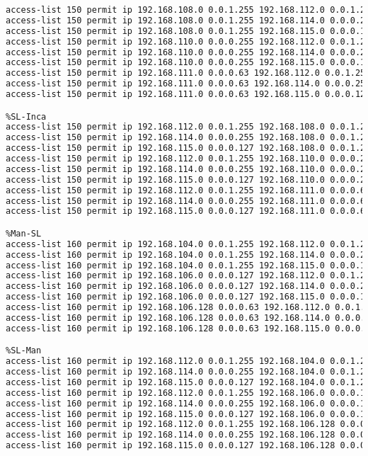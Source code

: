 \begin{lstlisting}[language=Bash, caption={Configuración ACLs Routers Interconexión}]
%Inca-SL
access-list 150 permit ip 192.168.108.0 0.0.1.255 192.168.112.0 0.0.1.255 
access-list 150 permit ip 192.168.108.0 0.0.1.255 192.168.114.0 0.0.0.255 
access-list 150 permit ip 192.168.108.0 0.0.1.255 192.168.115.0 0.0.0.127 
access-list 150 permit ip 192.168.110.0 0.0.0.255 192.168.112.0 0.0.1.255 
access-list 150 permit ip 192.168.110.0 0.0.0.255 192.168.114.0 0.0.0.255 
access-list 150 permit ip 192.168.110.0 0.0.0.255 192.168.115.0 0.0.0.127 
access-list 150 permit ip 192.168.111.0 0.0.0.63 192.168.112.0 0.0.1.255 
access-list 150 permit ip 192.168.111.0 0.0.0.63 192.168.114.0 0.0.0.255 
access-list 150 permit ip 192.168.111.0 0.0.0.63 192.168.115.0 0.0.0.127

%SL-Inca
access-list 150 permit ip 192.168.112.0 0.0.1.255 192.168.108.0 0.0.1.255  
access-list 150 permit ip 192.168.114.0 0.0.0.255 192.168.108.0 0.0.1.255  
access-list 150 permit ip 192.168.115.0 0.0.0.127 192.168.108.0 0.0.1.255  
access-list 150 permit ip 192.168.112.0 0.0.1.255 192.168.110.0 0.0.0.255  
access-list 150 permit ip 192.168.114.0 0.0.0.255 192.168.110.0 0.0.0.255  
access-list 150 permit ip 192.168.115.0 0.0.0.127 192.168.110.0 0.0.0.255  
access-list 150 permit ip 192.168.112.0 0.0.1.255 192.168.111.0 0.0.0.63  
access-list 150 permit ip 192.168.114.0 0.0.0.255 192.168.111.0 0.0.0.63  
access-list 150 permit ip 192.168.115.0 0.0.0.127 192.168.111.0 0.0.0.63 

%Man-SL
access-list 160 permit ip 192.168.104.0 0.0.1.255 192.168.112.0 0.0.1.255
access-list 160 permit ip 192.168.104.0 0.0.1.255 192.168.114.0 0.0.0.255
access-list 160 permit ip 192.168.104.0 0.0.1.255 192.168.115.0 0.0.0.127
access-list 160 permit ip 192.168.106.0 0.0.0.127 192.168.112.0 0.0.1.255
access-list 160 permit ip 192.168.106.0 0.0.0.127 192.168.114.0 0.0.0.255
access-list 160 permit ip 192.168.106.0 0.0.0.127 192.168.115.0 0.0.0.127
access-list 160 permit ip 192.168.106.128 0.0.0.63 192.168.112.0 0.0.1.255
access-list 160 permit ip 192.168.106.128 0.0.0.63 192.168.114.0 0.0.0.255
access-list 160 permit ip 192.168.106.128 0.0.0.63 192.168.115.0 0.0.0.127

%SL-Man
access-list 160 permit ip 192.168.112.0 0.0.1.255 192.168.104.0 0.0.1.255 
access-list 160 permit ip 192.168.114.0 0.0.0.255 192.168.104.0 0.0.1.255 
access-list 160 permit ip 192.168.115.0 0.0.0.127 192.168.104.0 0.0.1.255 
access-list 160 permit ip 192.168.112.0 0.0.1.255 192.168.106.0 0.0.0.127 
access-list 160 permit ip 192.168.114.0 0.0.0.255 192.168.106.0 0.0.0.127 
access-list 160 permit ip 192.168.115.0 0.0.0.127 192.168.106.0 0.0.0.127 
access-list 160 permit ip 192.168.112.0 0.0.1.255 192.168.106.128 0.0.0.63 
access-list 160 permit ip 192.168.114.0 0.0.0.255 192.168.106.128 0.0.0.63 
access-list 160 permit ip 192.168.115.0 0.0.0.127 192.168.106.128 0.0.0.63 


\end{lstlisting}
